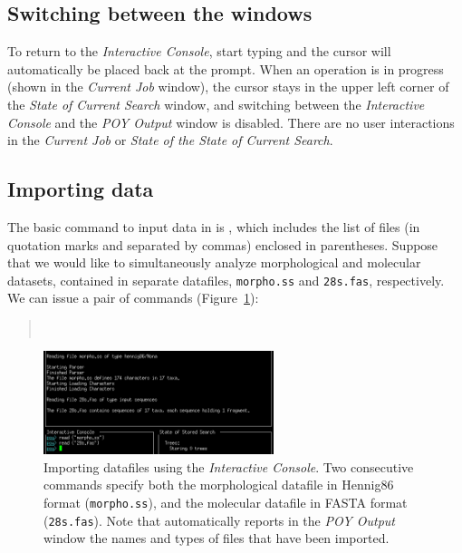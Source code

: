 \subsection{Switching between the windows}
To return to the \emph{Interactive Console}, start typing and the cursor will automatically be placed back at the \poy prompt. When an operation is in progress (shown in the \emph{Current Job} window), the cursor stays in the upper left corner of the \emph{State of Current Search} window, and switching between the \emph{Interactive Console} and the \emph{POY Output} window is disabled. There are no user interactions in the \emph{Current Job} or \emph{State of the State of Current Search}.

\subsection{Importing data} \label{sec:import}

The basic command to input data in \poy is , which includes the list of files (in quotation marks and separated by commas) enclosed in parentheses. Suppose that we would like to simultaneously analyze morphological and molecular datasets, contained in separate datafiles, \texttt{morpho.ss} and \texttt{28s.fas}, respectively. We can issue a pair of  commands (Figure~\ref{fig:readingexample}):
\begin{quote}
        \\
\end{quote}

\begin{figure}
    \begin{center}
        \includegraphics[width=0.6\textwidth]{doc/figures/reading_example.jpg}
    \end{center}
    \caption{Importing datafiles using the \emph{Interactive Console}. Two consecutive  commands specify both the morphological datafile in Hennig86 format (\texttt{morpho.ss}), and the molecular datafile in FASTA format (\texttt{28s.fas}). Note that \poy automatically reports  in the \emph{POY Output} window the names and types of files that have been imported.}
    \label{fig:readingexample}
\end{figure}

